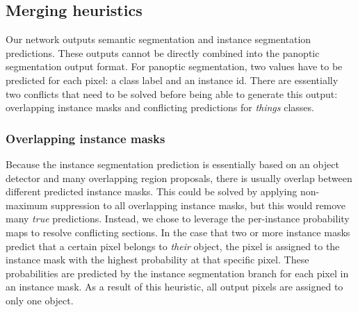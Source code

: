 \documentclass[10pt,twocolumn,letterpaper]{article}
\begin{document}
\subsection{Merging heuristics}
\label{sec:heuristics}
Our network outputs semantic segmentation and instance segmentation predictions. These outputs cannot be directly combined into the panoptic segmentation output format. For panoptic segmentation, two values have to be predicted for each pixel: a class label and an instance id. There are essentially two conflicts that need to be solved before being able to generate this output: overlapping instance masks and conflicting predictions for \textit{things} classes.

\subsubsection{Overlapping instance masks}
Because the instance segmentation prediction is essentially based on an object detector and many overlapping region proposals, there is usually overlap between different predicted instance masks. This could be solved by applying non-maximum suppression to all overlapping instance masks, but this would remove many \textit{true} predictions. Instead, we chose to leverage the per-instance probability maps to resolve conflicting sections. In the case that two or more instance masks predict that a certain pixel belongs to \textit{their} object, the pixel is assigned to the instance mask with the highest probability at that specific pixel. These probabilities are predicted by the instance segmentation branch for each pixel in an instance mask. As a result of this heuristic, all output pixels are assigned to only one object.
\end{document}

